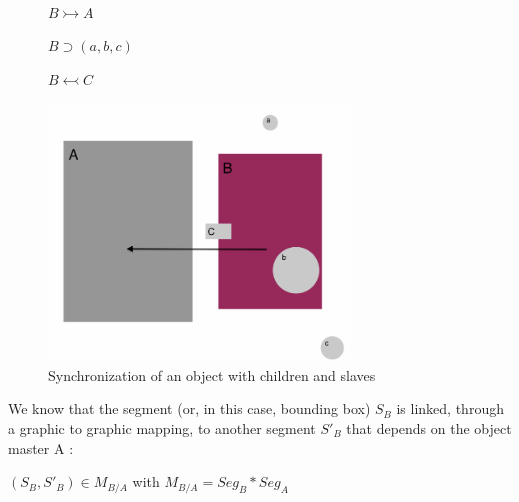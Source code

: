 \documentclass[a4paper]{article}
\begin{document}
\begin{figure}[h]

\begin{multicols}{2}

\\

 $B \rightarrowtail A$

 $B \supset (a, b, c)$

 $B \leftarrowtail C$

\columnbreak

\includegraphics[width=8cm]{img/exemple.png}   	            

\end{multicols}

\caption{Synchronization of an object with children and slaves}
\label{fig:defaultMap}
\end{figure}

\bigskip

We know that the segment (or, in this case, bounding box) $S_B$ is linked, through a graphic to graphic mapping, to another segment $S'_B$ that depends on the object master A : 

\begin{center} $(S_B, S'_B) \in M_{B/A}$ with $M_{B/A} = Seg_B * Seg_A$ \end{center}
\end{document}
